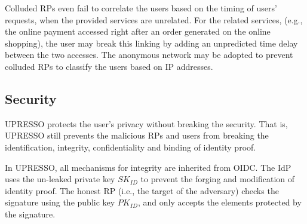 \begin{itemize}

\end{itemize}

Colluded RPs even fail to correlate the users based on the timing of users' requests, when the provided services are unrelated. For the related services, (e.g., the online payment accessed right after an order generated on the online shopping), the user may break this linking by adding an unpredicted time delay between the two accesses. The anonymous network may be adopted to prevent colluded RPs to classify the users based on IP addresses.

\begin{comment}
\begin{itemize}
  \item A \textbf{curious} RP fails to infer the user's unique identifier (i.e., UID) through $PUID$.
   \item A \textbf{colluded curious} RP fails to link a user between RPs.
  \item A \textbf{malicious} RP fails to make the UID leaked.
  \item The \textbf{colluded malicious RPs} fail to (actively) make the UID leaked.
  \item The \textbf{colluded malicious RPs} fail to actively trigger the generation of a same PPID or derivable PPIDs.
  \item The \textbf{colluded malicious RPs} fail to passively link a user between RPs.
\end{itemize}
\end{comment}

\subsection{Security}
\label{subsec:security}
UPRESSO protects the user's privacy without breaking the security. That is, UPRESSO still prevents the malicious RPs and users from breaking the identification, integrity, confidentiality and binding of identity proof.

In UPRESSO, all mechanisms for integrity are inherited from OIDC. The IdP uses the un-leaked private key $SK_{ID}$ to prevent the forging and modification of identity proof. The honest RP (i.e., the target of the adversary) checks the signature using the public key $PK_{ID}$, and only accepts the elements protected by the signature.

